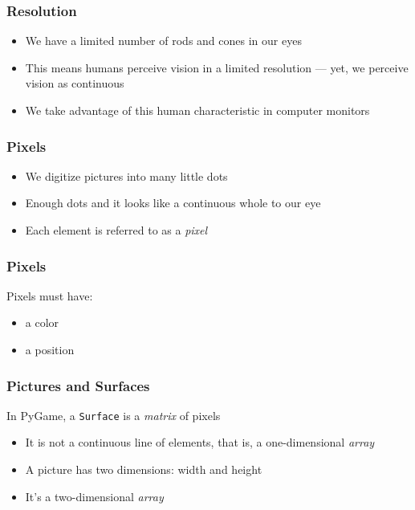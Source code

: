 
\begin{frame}
	\frametitle{Resolution}
	\begin{itemize}
		\item We have a limited number of rods and cones in our eyes
		\item This means humans perceive vision in a limited resolution --- yet, we perceive vision as continuous
		\item We take advantage of this human characteristic in computer monitors
	\end{itemize}
\end{frame}


\begin{frame}
	\frametitle{Pixels}
	\begin{itemize}
		\item We digitize pictures into many little dots
		\item Enough dots and it looks like a continuous whole to our eye
		\item Each element is referred to as a \textit{pixel}
	\end{itemize}
\end{frame}

\begin{frame}
	\frametitle{Pixels}
	
	Pixels must have:
	
	\begin{itemize}
		\item a color
		\item a position
	\end{itemize}
\end{frame}

\begin{frame}
	\frametitle{Pictures and Surfaces}
	
	In PyGame, a \texttt{Surface} is a \textit{matrix} of pixels
	
	\begin{itemize}
		\item It is not a continuous line of elements, that is, a one-dimensional \textit{array}
		\item A picture has two dimensions: width and height
		\item It's a two-dimensional \textit{array}
	\end{itemize}
\end{frame}

